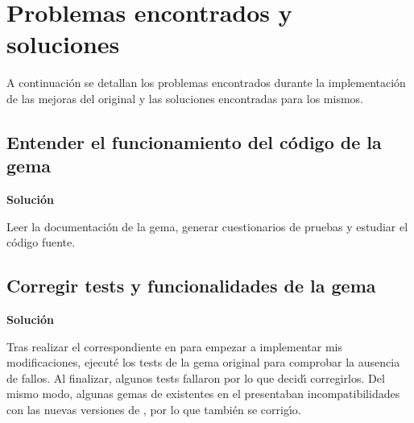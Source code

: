 \section{Problemas encontrados y soluciones}
\label{3:sec:1}

A continuaci\'on se detallan los problemas encontrados durante la implementaci\'on de las mejoras del  original y las soluciones
encontradas para los mismos.

\subsection{Entender el funcionamiento del c\'odigo de la gema}
\label{subsec:3.1.1}
\bigskip

{\normalsize {\bfseries Soluci\'on}}
\bigskip

Leer la documentaci\'on de la gema, generar cuestionarios de pruebas y estudiar el c\'odigo fuente.

\subsection{Corregir tests y funcionalidades de la gema}
\label{subsec:3.1.2}
\bigskip

{\normalsize {\bfseries Soluci\'on}}
\bigskip

Tras realizar el correspondiente \cei{\ref{apend1:fork}} en  para empezar a implementar mis modificaciones, ejecut\'e los tests de la 
gema original para comprobar la ausencia de fallos. Al finalizar, algunos tests fallaron por lo que decid\'{\i} corregirlos. Del 
mismo modo, algunas gemas de  existentes en el \ceit{\ref{apend1:gemfile}} presentaban incompatibilidades con las nuevas versiones de , por
lo que tambi\'en se corrig\'{\i}o.
\bigskip
